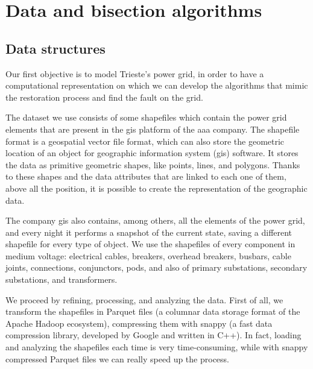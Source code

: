 \chapter{Data and bisection algorithms}


\section{Data structures}

Our first objective is to model Trieste's power grid, in order to have a computational representation on which we can develop the algorithms that mimic the restoration process and find the fault on the grid.

The dataset we use consists of some shapefiles which contain the power grid elements that are present in the \acrshort{gis} platform of the \acrshort{aaa} company. The shapefile format is a geospatial vector file format, which can also store the geometric location of an object for geographic information system (\acrshort{gis}) software. It stores the data as primitive geometric shapes, like points, lines, and polygons. Thanks to these shapes and the data attributes that are linked to each one of them, above all the position, it is possible to create the representation of the geographic data.

The company \acrshort{gis} also contains, among others, all the elements of the power grid, and every night it performs a snapshot of the current state, saving a different shapefile for every type of object. We use the shapefiles of every component in medium voltage: electrical cables, breakers, overhead breakers, busbars, cable joints, connections, conjunctors, pods, and also of primary substations, secondary substations, and transformers.



We proceed by refining, processing, and analyzing the data. First of all, we transform the shapefiles in Parquet files (a columnar data storage format of the Apache Hadoop ecosystem), compressing them with snappy (a fast data compression library, developed by Google and written in C++). In fact, loading and analyzing the shapefiles each time is very time-consuming, while with snappy compressed Parquet files we can really speed up the process.

